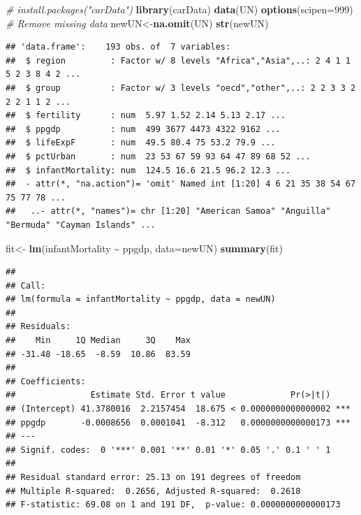 \documentclass[
]{article}
\newenvironment{Shaded}{\begin{snugshade}}{\end{snugshade}}
\newcommand{\AttributeTok}[1]{\textcolor[rgb]{0.13,0.29,0.53}{#1}}
\newcommand{\CommentTok}[1]{\textcolor[rgb]{0.56,0.35,0.01}{\textit{#1}}}
\newcommand{\DecValTok}[1]{\textcolor[rgb]{0.00,0.00,0.81}{#1}}
\newcommand{\FunctionTok}[1]{\textcolor[rgb]{0.13,0.29,0.53}{\textbf{#1}}}
\newcommand{\NormalTok}[1]{#1}
\newcommand{\OtherTok}[1]{\textcolor[rgb]{0.56,0.35,0.01}{#1}}
\newcommand{\SpecialCharTok}[1]{\textcolor[rgb]{0.81,0.36,0.00}{\textbf{#1}}}
\begin{document}
\begin{Shaded}
\begin{Highlighting}[]
\CommentTok{\# install.packages("carData")}
\FunctionTok{library}\NormalTok{(carData)}
\FunctionTok{data}\NormalTok{(UN)}
\FunctionTok{options}\NormalTok{(}\AttributeTok{scipen=}\DecValTok{999}\NormalTok{)}
\CommentTok{\# Remove missing data}
\NormalTok{newUN}\OtherTok{\textless{}{-}}\FunctionTok{na.omit}\NormalTok{(UN) }
\FunctionTok{str}\NormalTok{(newUN)}
\end{Highlighting}
\end{Shaded}

\begin{verbatim}
## 'data.frame':    193 obs. of  7 variables:
##  $ region         : Factor w/ 8 levels "Africa","Asia",..: 2 4 1 1 5 2 3 8 4 2 ...
##  $ group          : Factor w/ 3 levels "oecd","other",..: 2 2 3 3 2 2 2 1 1 2 ...
##  $ fertility      : num  5.97 1.52 2.14 5.13 2.17 ...
##  $ ppgdp          : num  499 3677 4473 4322 9162 ...
##  $ lifeExpF       : num  49.5 80.4 75 53.2 79.9 ...
##  $ pctUrban       : num  23 53 67 59 93 64 47 89 68 52 ...
##  $ infantMortality: num  124.5 16.6 21.5 96.2 12.3 ...
##  - attr(*, "na.action")= 'omit' Named int [1:20] 4 6 21 35 38 54 67 75 77 78 ...
##   ..- attr(*, "names")= chr [1:20] "American Samoa" "Anguilla" "Bermuda" "Cayman Islands" ...
\end{verbatim}

\begin{Shaded}
\begin{Highlighting}[]
\NormalTok{fit}\OtherTok{\textless{}{-}} \FunctionTok{lm}\NormalTok{(infantMortality }\SpecialCharTok{\textasciitilde{}}\NormalTok{ ppgdp, }\AttributeTok{data=}\NormalTok{newUN)}
\FunctionTok{summary}\NormalTok{(fit)}
\end{Highlighting}
\end{Shaded}

\begin{verbatim}
## 
## Call:
## lm(formula = infantMortality ~ ppgdp, data = newUN)
## 
## Residuals:
##    Min     1Q Median     3Q    Max 
## -31.48 -18.65  -8.59  10.86  83.59 
## 
## Coefficients:
##               Estimate Std. Error t value             Pr(>|t|)    
## (Intercept) 41.3780016  2.2157454  18.675 < 0.0000000000000002 ***
## ppgdp       -0.0008656  0.0001041  -8.312   0.0000000000000173 ***
## ---
## Signif. codes:  0 '***' 0.001 '**' 0.01 '*' 0.05 '.' 0.1 ' ' 1
## 
## Residual standard error: 25.13 on 191 degrees of freedom
## Multiple R-squared:  0.2656, Adjusted R-squared:  0.2618 
## F-statistic: 69.08 on 1 and 191 DF,  p-value: 0.0000000000000173
\end{verbatim}
\end{document}
